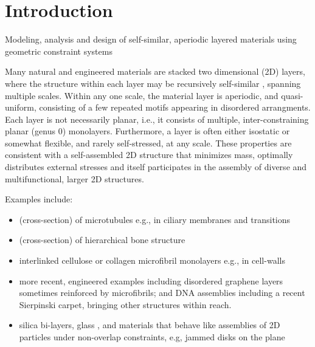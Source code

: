 \section{Introduction}
Modeling, analysis and design of self-similar, aperiodic layered materials using geometric constraint systems
 

Many natural and engineered materials are stacked two dimensional (2D) layers, where the structure within each layer may be recursively 
self-similar \cite{Intro1}, 
spanning multiple scales. Within any one scale, the material layer is aperiodic, and quasi-uniform,
consisting of a few repeated motifs appearing in disordered arrangments.
Each layer is not necessarily planar, i.e., it consists of multiple, inter-constraining planar (genus 0) monolayers. 
Furthermore, a layer is often   either isostatic or somewhat flexible, and rarely self-stressed, at any scale. These properties are
consistent with a self-assembled 2D structure that minimizes mass, optimally distributes external stresses and itself 
participates in the assembly of diverse and multifunctional, 
larger 2D structures.

Examples include:

\begin{itemize}
    
    \item (cross-section) of microtubules \cite{Necklace1} e.g., in ciliary membranes and transitions \cite{Necklace2}
    
    \item (cross-section) of hierarchical bone structure \cite{XX}
    
    \item interlinked cellulose or collagen microfibril monolayers e.g., in cell-walls \cite{CellWalls1} \cite{CellWalls1}
    
    \item more recent, engineered examples including  disordered graphene layers \cite{Graphene1} \cite{Graphene2} sometimes reinforced 
    by  microfibrils; and DNA assemblies \cite{Microfibrils1} including a recent Sierpinski carpet, bringing other structures 
    \cite{Microfibrils2} within reach.
    
    \item  silica bi-layers, glass \cite{SilicaGlass1} \cite{SilicaGlass2}, and materials that behave like assemblies of 
    2D particles under non-overlap constraints, e.g, jammed 
    disks on the plane \cite{JammedDisk1}

   
\end{itemize}


